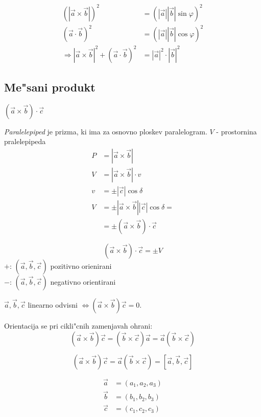 \begin{align*}
	(|\vec{a} \times \vec{b}|)^2 &= (|\vec{a}| |\vec{b}| \sin \varphi)^2\\
	(\vec{a} \cdot \vec{b})^2 &= (|\vec{a}| |\vec{b}| \cos \varphi)^2\\
	\Rightarrow |\vec{a} \times \vec{b}|^2 + (\vec{a} \cdot \vec{b})^2 &= |\vec{a}|^2 \cdot |\vec{b}|^2
\end{align*}


\subsection{Me"sani produkt}
$(\vec{a} \times \vec{b}) \cdot \vec{c}$

\emph{Paralelepiped} je prizma, ki ima za osnovno ploskev paralelogram.
$V$ - prostornina pralelepipeda\\
\begin{align*}
	P &= |\vec{a} \times \vec{b}|\\
	V &= |\vec{a} \times \vec{b}| \cdot v\\
	v &= \pm |\vec{c}| \cos \delta\\
	V &= \pm |\vec{a} \times \vec{b}| |\vec{c}| \cos \delta =\\
	&= \pm (\vec{a} \times \vec{b}) \cdot \vec{c}
\end{align*}

\[(\vec{a} \times \vec{b}) \cdot \vec{c} = \pm V\]
$+$: $(\vec{a}, \vec{b}, \vec{c})$ pozitivno orienirani\\
$-$: $(\vec{a}, \vec{b}, \vec{c})$ negativno orientirani

$\vec{a}, \vec{b}, \vec{c}$ linearno odvisni $\Leftrightarrow (\vec{a} \times \vec{b})\vec{c} = 0$.

Orientacija se pri cikli"cnih zamenjavah ohrani:
\[(\vec{a} \times \vec{b}) \vec{c} = (\vec{b} \times \vec{c})\vec{a} = \vec{a}(\vec{b} \times \vec{c})\]

\[(\vec{a} \times \vec{b})\vec{c} = \vec{a}(\vec{b} \times \vec{c}) = [\vec{a}, \vec{b}, \vec{c}]\]

\begin{align*}
	\vec{a} &= (a_1, a_2, a_3)\\
	\vec{b} &= (b_1, b_2, b_3)\\
	\vec{c} &= (c_1, c_2, c_3)
\end{align*}

